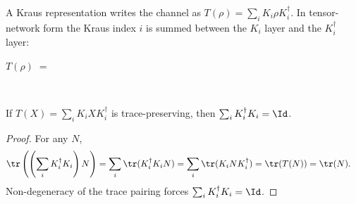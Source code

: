 A Kraus representation writes the channel as
$T(\rho)=\sum_i K_i\rho K_i^\dagger$. In tensor-network form the Kraus index $i$
is summed between the $K_i$ layer and the $K_i^\dagger$ layer:
\begin{tenkzequation}
    \tenkzkernel
    $T(\rho) \;=\;$
    \begin{tenkz}[rows={ket,bra}, cols=1, west=open, east={cup=$\rho$}]
         \\
    \end{tenkz}
\end{tenkzequation}

\begin{theorem}\label{thm:kraus_sum_conjTranspose_mul_of_tp}
    \leanok
    If $T(X) = \sum_i K_i X K_i^\dagger$ is trace-preserving, then
    $\sum_i K_i^\dagger K_i = \Id$.
\end{theorem}

\begin{proof}
    \leanok
    For any $N$,
    \begin{align}
        \tr\left(\left(\sum_i K_i^\dagger K_i\right)N\right)
        &= \sum_i \tr(K_i^\dagger K_i N)
         = \sum_i \tr(K_i N K_i^\dagger)
         = \tr(T(N))
         = \tr(N).
        \notag
    \end{align}
    Non-degeneracy of the trace pairing forces
    $\sum_i K_i^\dagger K_i = \Id$.
\end{proof}

